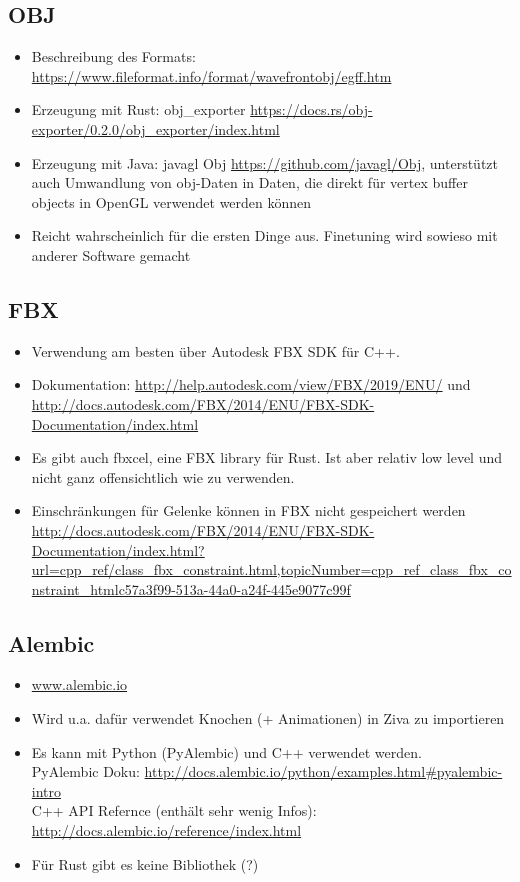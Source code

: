 \subsection{OBJ}

\begin{itemize}
 \item Beschreibung des Formats: \url{https://www.fileformat.info/format/wavefrontobj/egff.htm}
 \item Erzeugung mit Rust: obj\_exporter \url{https://docs.rs/obj-exporter/0.2.0/obj_exporter/index.html}
 \item Erzeugung mit Java: javagl Obj \url{https://github.com/javagl/Obj}, unterstützt auch Umwandlung von obj-Daten in Daten, die direkt für vertex buffer objects in OpenGL verwendet werden können
 \item Reicht wahrscheinlich für die ersten Dinge aus. Finetuning wird sowieso mit anderer Software gemacht
\end{itemize}

\subsection{FBX}

\begin{itemize}
 \item Verwendung am besten über Autodesk FBX SDK für C++. 
 \item Dokumentation: \url{http://help.autodesk.com/view/FBX/2019/ENU/} und \url{http://docs.autodesk.com/FBX/2014/ENU/FBX-SDK-Documentation/index.html}
 \item Es gibt auch fbxcel, eine FBX library für Rust. Ist aber relativ low level und nicht ganz offensichtlich wie zu verwenden.
 \item Einschränkungen für Gelenke können in FBX nicht gespeichert werden \url{http://docs.autodesk.com/FBX/2014/ENU/FBX-SDK-Documentation/index.html?url=cpp_ref/class_fbx_constraint.html,topicNumber=cpp_ref_class_fbx_constraint_htmlc57a3f99-513a-44a0-a24f-445e9077c99f}
\end{itemize}

\subsection{Alembic}

\begin{itemize}
 \item \url{www.alembic.io}
 \item Wird u.a. dafür verwendet Knochen (+ Animationen) in Ziva zu importieren
 \item Es kann mit Python (PyAlembic) und C++ verwendet werden.\\
 PyAlembic Doku: \url{http://docs.alembic.io/python/examples.html#pyalembic-intro}\\
 C++ API Refernce (enthält sehr wenig Infos): \url{http://docs.alembic.io/reference/index.html}
 \item Für Rust gibt es keine Bibliothek (?)
\end{itemize}

